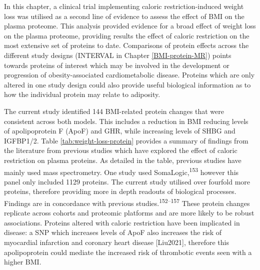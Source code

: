 \documentclass[11pt,twoside]{bristolthesis}
\begin{document}
In this chapter, a clinical trial implementing caloric restriction-induced weight loss was utilised as a second line of evidence to assess the effect of BMI on the plasma proteome. This analysis provided evidence for a broad effect of weight loss on the plasma proteome, providing results the effect of caloric restriction on the most extensive set of proteins to date. Comparisons of protein effects across the different study designs (INTERVAL in Chapter \ref{BMI-protein-MR}) points towards proteins of interest which may be involved in the development or progression of obesity-associated cardiometabolic disease. Proteins which are only altered in one study design could also provide useful biological information as to how the individual protein may relate to adiposity.

The current study identified 144 BMI-related protein changes that were consistent across both models. This includes a reduction in BMI reducing levels of apolipoprotein F (ApoF) and GHR, while increasing levels of SHBG and IGFBP1/2. Table \ref{tab:weight-loss-protein} provides a summary of findings from the literature from previous studies which have explored the effect of caloric restriction on plasma proteins. As detailed in the table, previous studies have mainly used mass spectrometry. One study used SomaLogic,\textsuperscript{153} however this panel only included 1129 proteins. The current study utilised over fourfold more proteins, therefore providing more in depth readouts of biological processes. Findings are in concordance with previous studies.\textsuperscript{152--157} These protein changes replicate across cohorts and proteomic platforms and are more likely to be robust associations. Proteins altered with caloric restriction have been implicated in disease: a SNP which increases levels of ApoF also increases the risk of myocardial infarction and coronary heart disease {[}Liu2021{]}, therefore this apolipoprotein could mediate the increased risk of thrombotic events seen with a higher BMI.
\end{document}
